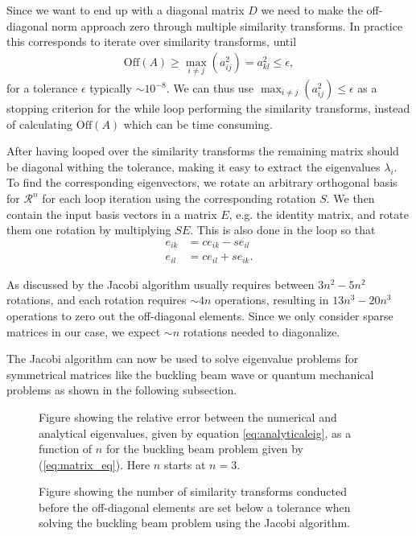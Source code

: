 \documentclass[twocolumn]{aastex62}
\begin{document}
Since we want to end up with a diagonal matrix $D$ we need to make the off-diagonal norm approach zero through multiple similarity transforms. In practice this corresponds to iterate over similarity transforms, until 
\begin{align}
\text{Off}(A) \geq \max_{i\neq j}(a_{ij}^2) = a_{kl}^2 \leq \epsilon,
\end{align}
for a tolerance $\epsilon$ typically $\sim 10^{-8}$. We can thus use 
$\max_{i\neq j}(a_{ij}^2)\leq \epsilon$ as a stopping criterion for the while loop performing the similarity transforms, instead of calculating $\text{Off}(A)$ which can be time consuming.

After having looped over the similarity transforms the remaining matrix should be diagonal withing the tolerance, making it easy to extract the eigenvalues $\lambda_i$. To find the corresponding eigenvectors, we rotate an arbitrary orthogonal basis for $\mathcal{R}^n$ for each loop iteration using the corresponding rotation $S$. We then contain the input basis vectors in a matrix $E$, e.g. the identity matrix, and rotate them one rotation by multiplying $SE$. This is also done in the loop so that 
\begin{align}
	e_{ik} &= ce_{ik} - se_{il}\\
	e_{il} &= ce_{il} + se_{ik}.
\end{align}

As discussed by \citep[p. 217]{Jensen:2015} the Jacobi algorithm usually requires between $3n^2-5n^2$ rotations, and each rotation requires $\sim 4n$ operations, resulting in $13n^3-20n^3$ operations to zero out the off-diagonal elements. Since we only consider sparse matrices in our case, we expect $\sim n$ rotations needed to diagonalize. 

The Jacobi algorithm can now be used to solve eigenvalue problems for symmetrical matrices like the buckling beam wave or quantum mechanical problems as shown in the following subsection. 

\begin{figure*}[h]
	\caption{Figure showing the relative error between the numerical and analytical eigenvalues, given by equation \ref{eq:analyticaleig}, as a function of $n$ for the buckling beam problem given by (\ref{eq:matrix_eq}). Here $n$ starts at $n=3$. }
	\label{fig:relerr}
\end{figure*}

\begin{figure*}[h]
	\caption{Figure showing the number of similarity transforms conducted before the off-diagonal elements are set below a tolerance when solving the buckling beam problem using the Jacobi algorithm.}
	\label{fig:iteration}
\end{figure*}
\end{document}
